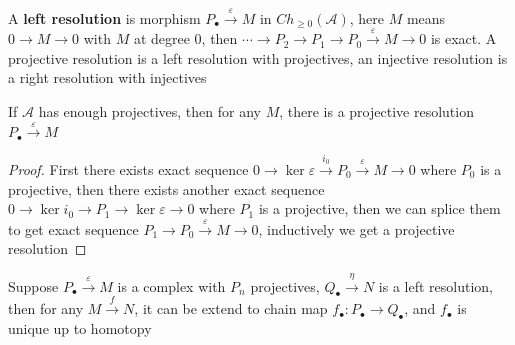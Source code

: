 \documentclass[../main.tex]{subfiles}
\begin{document}
\begin{definition}
A \textbf{left resolution} is morphism $P_\bullet\xrightarrow{\varepsilon} M$ in $Ch_{\geq0}(\mathscr A)$, here $M$ means $0\to M\to0$ with $M$ at degree $0$, then $\cdots\to P_2\to P_1\to P_0\xrightarrow{\varepsilon}M\to0$ is exact. A projective resolution is a left resolution with projectives, an injective resolution is a right resolution with injectives
\end{definition}

\begin{lemma}
If $\mathscr A$ has enough projectives, then for any $M$, there is a projective resolution $P_\bullet\xrightarrow{\varepsilon} M$
\end{lemma}

\begin{proof}
First there exists exact sequence $0\to\ker\varepsilon\xrightarrow{i_0} P_0\xrightarrow{\varepsilon}M\to0$ where $P_0$ is a projective, then there exists another exact sequence $0\to\ker i_0\to P_1\to\ker\varepsilon\to0$ where $P_1$ is a projective, then we can splice them to get exact sequence $P_1\to P_0\xrightarrow{\varepsilon}M\to0$, inductively we get a projective resolution
\end{proof}

\begin{theorem}\label{Comparison theorem}
Suppose $P_\bullet\xrightarrow{\varepsilon} M$ is a complex with $P_n$ projectives, $Q_\bullet\xrightarrow{\eta} N$ is a left resolution, then for any $M\xrightarrow{f}N$, it can be extend to chain map $f_\bullet:P_\bullet\to Q_\bullet$, and $f_\bullet$ is unique up to homotopy
\begin{center}
\end{center}
\end{theorem}
\end{document}
